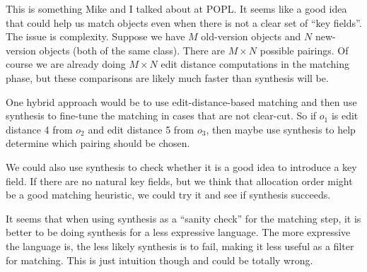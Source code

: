 \documentclass[natbib]{sigplanconf}
\begin{document}
This is something Mike and I talked about at POPL.  It seems like a
good idea that could help us match objects even when there is not a
clear set of ``key fields''.  The issue is complexity.  Suppose we
have $M$ old-version objects and $N$ new-version objects (both of the
same class).  There are $M \times N$ possible pairings.  Of course we
are already doing $M \times N$ edit distance computations in the
matching phase, but these comparisons are likely much faster than
synthesis will be.

One hybrid approach would be to use edit-distance-based matching and
then use synthesis to fine-tune the matching in cases that are not
clear-cut.  So if $o_1$ is edit distance 4 from $o_2$ and edit
distance 5 from $o_3$, then maybe use synthesis to help determine
which pairing should be chosen.

We could also use synthesis to check whether it is a good idea to
introduce a key field.  If there are no natural key fields, but we
think that allocation order might be a good matching heuristic, we
could try it and see if synthesis succeeds.

It seems that when using synthesis as a ``sanity check'' for the
matching step, it is better to be doing synthesis for a less
expressive language.  The more expressive the language is, the less
likely synthesis is to fail, making it less useful as a filter for
matching.  This is just intuition though and could be totally wrong.



% 
% 







 


\end{document}
